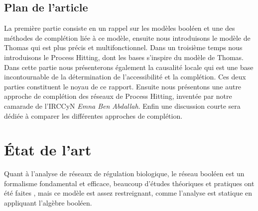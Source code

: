 \documentclass[11pt]{report}
\theoremstyle{definition}
\begin{document}
\begin{spacing}{1.1}
\section*{Plan de l'article}
La premi\`ere partie consiste en un rappel sur les mod\`eles bool\'een et une des m\'ethodes de compl\'etion li\'ee \`a ce mod\`ele,
ensuite nous introduisons le mod\`ele de Thomas qui est plus pr\'ecis et multifonctionnel.
Dans un troisi\`eme temps nous introduisons le Process Hitting, dont les bases s'inspire du mod\`ele de Thomas.
Dans cette partie nous pr\'esenterons \'egalement la causalit\'e locale qui est une base incontournable de la d\'etermination de l'accessibilit\'e et la compl\'etion.
Ces deux parties constituent le noyau de ce rapport. Ensuite nous pr\'esentons une autre approche de compl\'etion
des r\'eseaux de Process Hitting, invent\'ee par notre camarade de l'IRCCyN \textit{Emna Ben Abdallah}. Enfin
une discussion courte sera d\'edi\'ee \`a comparer les diff\'erentes approches de compl\'etion.
\end{spacing}
\chapter{\'Etat de l'art}
Quant \`a l'analyse de r\'eseaux de r\'egulation biologique, le r\'eseau bool\'een est un formalisme fondamental et efficace, beaucoup d'\'etudes th\'eoriques et pratiques ont \'et\'e faites \citep{Fox1993}, mais ce mod\`ele est assez restreignant, comme l'analyse est statique en appliquant l'alg\`ebre bool\'een.
\end{document}
